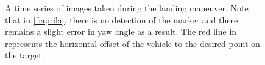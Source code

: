 \documentclass[]{aiaa-tc}
\begin{document}
\begin{figure}
\begin{subfigmatrix}{4}
 \end{subfigmatrix}
 \caption{A time series of images taken during the landing maneuver. Note that in \cref{f:aprila}, there is no detection of the marker and there remains a slight error in yaw angle as a result. The red line in  represents the horizontal offset of the vehicle to the desired point on the target.}
 \label{f:landing_ims}
\end{figure}
\end{document}
